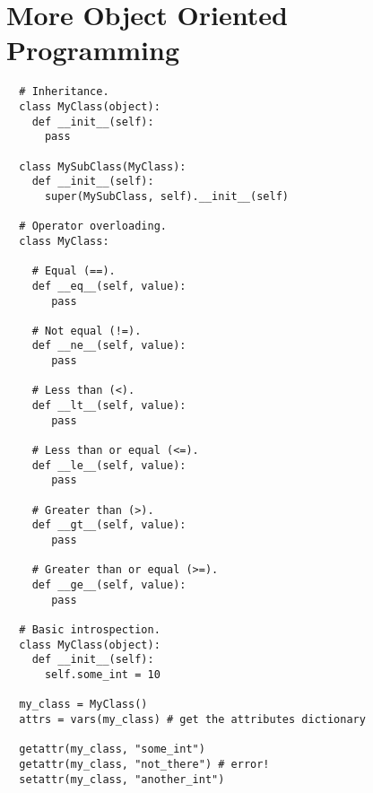 \documentclass[10pt]{article}
\begin{document}
\section{More Object Oriented Programming}
\begin{lstlisting}
  # Inheritance.
  class MyClass(object):
    def __init__(self):
      pass

  class MySubClass(MyClass):
    def __init__(self):
      super(MySubClass, self).__init__(self)

  # Operator overloading.
  class MyClass:

    # Equal (==).
    def __eq__(self, value):
       pass

    # Not equal (!=).
    def __ne__(self, value):
       pass

    # Less than (<).
    def __lt__(self, value):
       pass

    # Less than or equal (<=).
    def __le__(self, value):
       pass

    # Greater than (>).
    def __gt__(self, value):
       pass

    # Greater than or equal (>=).
    def __ge__(self, value):
       pass

  # Basic introspection.
  class MyClass(object):
    def __init__(self):
      self.some_int = 10

  my_class = MyClass()
  attrs = vars(my_class) # get the attributes dictionary

  getattr(my_class, "some_int")
  getattr(my_class, "not_there") # error!
  setattr(my_class, "another_int")
\end{lstlisting}
\end{document}
